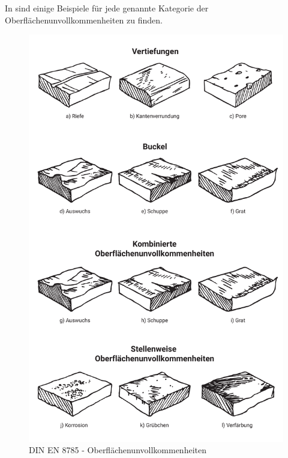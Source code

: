 In  sind einige Beispiele für jede genannte Kategorie der Oberflächenunvollkommenheiten zu finden. 

\begin{figure}[h]
	\centering
	\includegraphics[width=0.7\linewidth]{img/din_en_8785_beispiele}
	\caption[DIN EN ISO 8785 - Oberflächenunvollkommenheiten]{DIN EN 8785 - Oberflächenunvollkommenheiten}
	\label{fig:din-en-8785-beispiele}
\end{figure}









 






          


